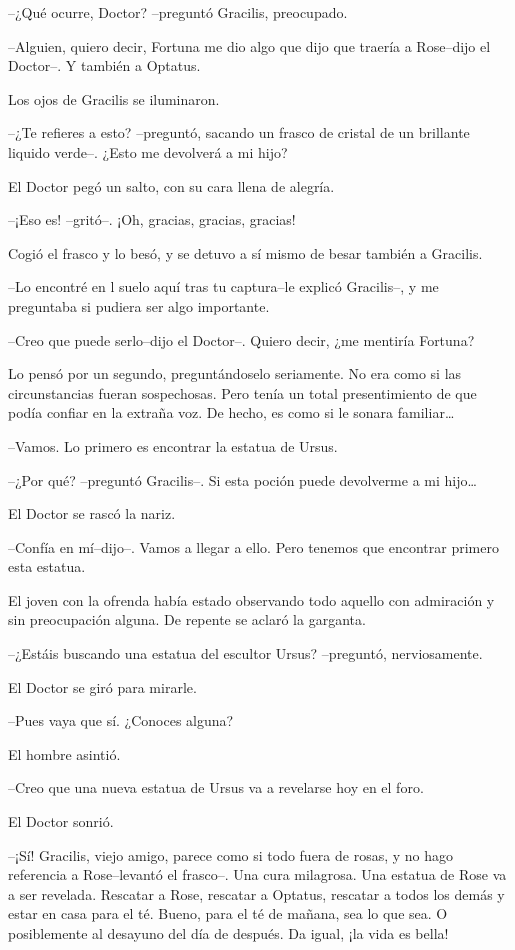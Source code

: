 --¿Qué ocurre, Doctor? --preguntó Gracilis, preocupado.

--Alguien, quiero decir, Fortuna me dio algo que dijo que traería a
Rose--dijo el Doctor--. Y también a Optatus.

Los ojos de Gracilis se iluminaron.

--¿Te refieres a esto? --preguntó, sacando un frasco de cristal de un
brillante liquido verde--. ¿Esto me devolverá a mi hijo?

El Doctor pegó un salto, con su cara llena de alegría.

--¡Eso es! --gritó--. ¡Oh, gracias, gracias, gracias!

Cogió el frasco y lo besó, y se detuvo a sí mismo de besar también a
Gracilis.

--Lo encontré en l suelo aquí tras tu captura--le explicó Gracilis--, y
me preguntaba si pudiera ser algo importante.

--Creo que puede serlo--dijo el Doctor--. Quiero decir, ¿me mentiría
Fortuna?

Lo pensó por un segundo, preguntándoselo seriamente. No era como si las
circunstancias fueran sospechosas. Pero tenía un total presentimiento de
que podía confiar en la extraña voz. De hecho, es como si le sonara
familiar\ldots{}

--Vamos. Lo primero es encontrar la estatua de Ursus.

--¿Por qué? --preguntó Gracilis--. Si esta poción puede devolverme a mi
hijo\ldots{}

El Doctor se rascó la nariz.

--Confía en mí--dijo--. Vamos a llegar a ello. Pero tenemos que
encontrar primero esta estatua.

El joven con la ofrenda había estado observando todo aquello con
admiración y sin preocupación alguna. De repente se aclaró la garganta.

--¿Estáis buscando una estatua del escultor Ursus? --preguntó,
nerviosamente.

El Doctor se giró para mirarle.

--Pues vaya que sí. ¿Conoces alguna?

El hombre asintió.

--Creo que una nueva estatua de Ursus va a revelarse hoy en el foro.

El Doctor sonrió.

--¡Sí! Gracilis, viejo amigo, parece como si todo fuera de rosas, y no
hago referencia a Rose--levantó el frasco--. Una cura milagrosa. Una
estatua de Rose va a ser revelada. Rescatar a Rose, rescatar a Optatus,
rescatar a todos los demás y estar en casa para el té. Bueno, para el té
de mañana, sea lo que sea. O posiblemente al desayuno del día de
después. Da igual, ¡la vida es bella!


